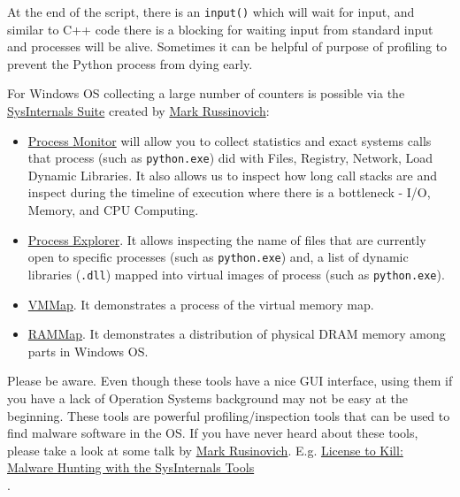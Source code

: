 \documentclass[
]{article}
\begin{document}
At the end of the script, there is an \texttt{input()} which will wait
for input, and similar to C++ code there is a blocking for waiting input
from standard input and processes will be alive. Sometimes it can be
helpful of purpose of profiling to prevent the Python process from dying
early.

For Windows OS collecting a large number of counters is possible via the
\href{https://learn.microsoft.com/en-us/sysinternals/}{SysInternals
Suite} created by
\href{https://en.wikipedia.org/wiki/Mark_Russinovich}{Mark Russinovich}:

\begin{itemize}
\item
  \href{https://learn.microsoft.com/en-us/sysinternals/downloads/procmon}{Process
  Monitor} will allow you to collect statistics and exact systems calls
  that process (such as \texttt{python.exe}) did with Files, Registry,
  Network, Load Dynamic Libraries. It also allows us to inspect how long
  call stacks are and inspect during the timeline of execution where
  there is a bottleneck - I/O, Memory, and CPU Computing.
\item
  \href{https://learn.microsoft.com/en-us/sysinternals/downloads/process-explorer}{Process
  Explorer}. It allows inspecting the name of files that are currently
  open to specific processes (such as \texttt{python.exe}) and, a list
  of dynamic libraries (\texttt{.dll}) mapped into virtual images of
  process (such as \texttt{python.exe}).
\item
  \href{https://learn.microsoft.com/en-us/sysinternals/downloads/vmmap}{VMMap}.
  It demonstrates a process of the virtual memory map.
\item
  \href{https://learn.microsoft.com/en-us/sysinternals/downloads/RAMMap}{RAMMap}.
  It demonstrates a distribution of physical DRAM memory among parts in
  Windows OS.
\end{itemize}

Please be aware. Even though these tools have a nice GUI interface,
using them if you have a lack of Operation Systems background may not be
easy at the beginning. These tools are powerful profiling/inspection
tools that can be used to find malware software in the OS. If you have
never heard about these tools, please take a look at some talk by
\href{https://en.wikipedia.org/wiki/Mark_Russinovich}{Mark Rusinovich}.
E.g.
\href{https://www.youtube.com/watch?v=A_TPZxuTzBU\&ab_channel=MarkRussinovich}{License
to Kill: Malware Hunting with the SysInternals Tools\\
}.
\end{document}
